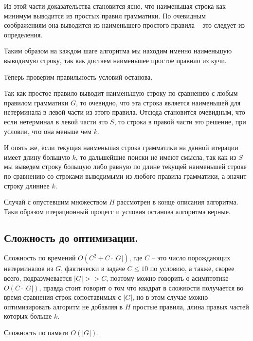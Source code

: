 \documentclass[12pt]{article}
\begin{document}
Из этой части доказательства становится ясно, что наименьшая строка
как минимум выводится из простых правил грамматики. По очевидным
соображениям она выводится из наименьшего простого правила -- это следует
из определения.

Таким образом на каждом шаге алгоритма мы находим именно наименьшую
выводимую строку, так как достаем наименьшее простое правило из кучи.

Теперь проверим правильность условий останова.

Так как простое правило выводит наименьшую строку по сравнению с любым
правилом грамматики $ G $, то очевидно, что эта строка является наименьшей
для нетерминала в левой части из этого правила. Отсюда становится очевидным,
что если нетерминал в левой части это $ S $, то строка в правой части это
решение, при условии, что она меньше чем $ k $.

И опять же, если текущая наименьшая строка грамматики на данной итерации
имеет длину большую $ k $, то дальшейшие поиски не имеют смысла, так как из
$ S $ мы выведем строку большую либо равную по длине текущей наименьшей
строке по сравнению со строками выводимыми из любого правила грамматики,
а значит строку длиннее $ k $.

Случай с опустевшим множеством $ H $ рассмотрен в конце описания алгоритма.
Таки образом итерационный процесс и условия останова алгоритма верные.

\subsection{Сложность до оптимизации.}
Сложность по времений $ O(C^2 + C \cdot |G|) $,
где $ C $ -- это число порождающих нетерминалов из $ G $, фактически в
задаче $ C \le 10 $ по условию, а также, скорее всего, подразумевается
$ |G| >> C $, поэтому можно говорить о асимптотике $ O(C \cdot |G|) $,
правда стоит говорит о том что квадрат в сложности получается во время
сравнения строк сопоставимых с $ |G| $, но в этом случае можно оптимизировать
алгоритм не добавляя в $ H $ простые правила, длина правых частей которых
больше $ k $.

Сложность по памяти $ O(|G|) $.
\end{document}
